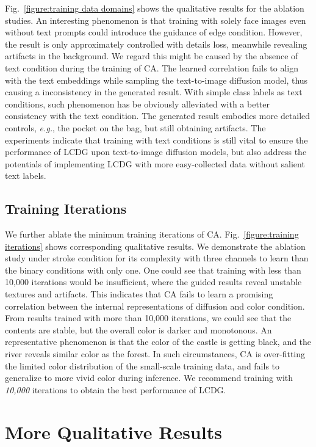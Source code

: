 \documentclass{article}
\begin{document}
Fig.~\ref{figure:training data domains} shows the qualitative results for the ablation studies. An interesting phenomenon is that training with solely face images even without text prompts could introduce the guidance of edge condition. However, the result is only approximately controlled with details loss, meanwhile revealing artifacts in the background. We regard this might be caused by the absence of text condition during the training of CA. The learned correlation fails to align with the text embeddings while sampling the text-to-image diffusion model, thus causing a inconsistency in the generated result. With simple class labels as text conditions, such phenomenon has be obviously alleviated with a better consistency with the text condition. The generated result embodies more detailed controls, \textit{e.g.}, the pocket on the bag, but still obtaining artifacts. The experiments indicate that training with text conditions is still vital to ensure the performance of LCDG upon text-to-image diffusion models, but also address the potentials of implementing LCDG with more easy-collected data without salient text labels.



\subsection{Training Iterations}
We further ablate the minimum training iterations of CA. Fig.~\ref{figure:training iterations} shows corresponding qualitative results. We demonstrate the ablation study under stroke condition for its complexity with three channels to learn than the binary conditions with only one. One could see that training with less than 10,000 iterations  would be insufficient, where the guided results reveal unstable textures and artifacts. This indicates that CA fails to learn a promising correlation between the internal representations of diffusion and color condition. From results trained with more than 10,000 iterations, we could see that the contents are stable, but the overall color is darker and monotonous. An representative phenomenon is that the color of the castle is getting black, and the river reveals similar color as the forest. In such circumstances, CA is over-fitting the limited color distribution of the small-scale training data, and fails to generalize to more vivid color during inference. We recommend training with \textit{10,000} iterations to obtain the best performance of LCDG.

\section{More Qualitative Results}
\label{section:more qualitative results}
\end{document}
